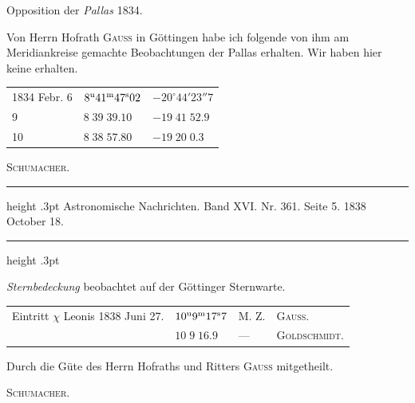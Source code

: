 \begin{center}Opposition der \emph{Pallas} 1834.\end{center}

Von Herrn Hofrath \textsc{Gauss} in Göttingen habe ich folgende von ihm am Meridiankreise gemachte Beobachtungen der Pallas erhalten. Wir haben hier keine erhalten.

\begin{center}
\begin{tabular}{l|l|l}
1834 Febr. 6 & $8^{\rm u}41^{\rm m}47^{\rm s}02$ & $-20^\circ44'23''7$ \\
\hfill 9 & $8\;39\;39.10$ & $-19\;41\;52.9$ \\
\hfill 10 & $8\;38\;57.80$ & $-19\;20\;0.3$ \\
\end{tabular}
\end{center}
\begin{flushright}\textsc{Schumacher.}\end{flushright}

\par\bigskip
{}
\hypertarget{native-468-occultation}{}
\begin{center}
\parbox{.78\linewidth}{%
\centering\small
\hrule height .3pt\relax\vspace{2.5pt}
Astronomische Nachrichten. Band XVI. Nr. 361. Seite 5. 1838 October 18.\par
\vspace{2.5pt}\hrule height .3pt\relax
}
\end{center}

\begin{center}\emph{Sternbedeckung} beobachtet auf der Göttinger Sternwarte.\end{center}

\begin{center}
\begin{tabular}{llll}
Eintritt $\chi$ Leonis 1838 Juni 27. & $10^{\rm u}9^{\rm m}17^{\rm s}7$ & M. Z. & \textsc{Gauss.} \\
 & $10\;9\;16.9$ & --- & \textsc{Goldschmidt.} \\
\end{tabular}
\end{center}

Durch die Güte des Herrn Hofraths und Ritters \textsc{Gauss} mitgetheilt.
\begin{flushright}\textsc{Schumacher.}\end{flushright}
